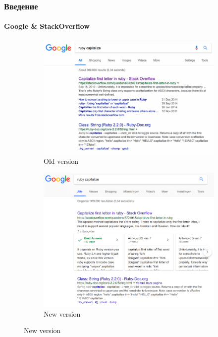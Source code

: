 \documentclass[10pt]{beamer}
\begin{document}
\begin{frame}
\frametitle{Введение}
\framesubtitle{Google \& StackOverflow}

\begin{figure}
	\begin{subfigure}[b]{0.49\linewidth}
		\centering
		\includegraphics[width=\linewidth]{images/google_search_old.png}
		\caption{Old version}
	\end{subfigure}\hfill
	\begin{subfigure}[b]{0.49\linewidth}
		\centering
		\includegraphics[width=\linewidth]{images/google_search_new.png}
		\caption{New version}
	\end{subfigure}
\end{figure}

\end{frame}
\end{document}
